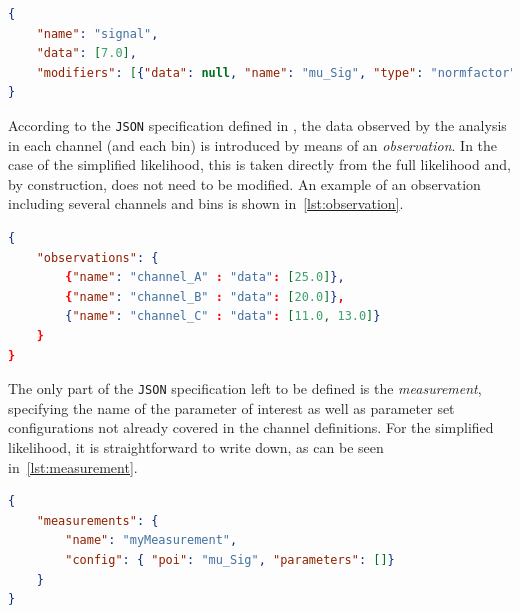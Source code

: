 \begin{minipage}{\linewidth}
\begin{lstlisting}[language=json,firstnumber=1,caption={Example of a signal sample with sample rate and unconstrained normalisation parameter.},captionpos=b, label=lst:sig_sample]
{
	"name": "signal",
	"data": [7.0],
	"modifiers": [{"data": null, "name": "mu_Sig", "type": "normfactor"}]
}
\end{lstlisting}
\end{minipage}

According to the \texttt{JSON} specification defined in \cite{ATL-PHYS-PUB-2019-029}, the data observed by the analysis in each channel (and each bin) is introduced by means of an \textit{observation}. In the case of the simplified likelihood, this is taken directly from the full likelihood and, by construction, does not need to be modified. An example of an observation including several channels and bins is shown in~\cref{lst:observation}.

\begin{minipage}{\linewidth}
\begin{lstlisting}[language=json,firstnumber=1,caption={Example of an observation in the simplified likelihood. It can be directly taken from the corresponding full likelihood. This example implements three channels, two with one bin, and one with three bins.},captionpos=b, label=lst:observation]
{
	"observations": {
		{"name": "channel_A" : "data": [25.0]},
		{"name": "channel_B" : "data": [20.0]},
		{"name": "channel_C" : "data": [11.0, 13.0]}
	}	
}
\end{lstlisting}
\end{minipage}

The only part of the \texttt{JSON} specification left to be defined is the \textit{measurement}, specifying the name of the parameter of interest as well as parameter set configurations not already covered in the channel definitions. For the simplified likelihood, it is straightforward to write down, as can be seen in~\cref{lst:measurement}.

\begin{minipage}{\linewidth}
\begin{lstlisting}[language=json,firstnumber=1,caption={Example of a measurement in the simplified likelihood. The signal strength is the parameter of interest, no additional parameters need further configuration.},captionpos=b, label=lst:measurement]
{
	"measurements": {
		"name": "myMeasurement",
		"config": { "poi": "mu_Sig", "parameters": []}
	}	
}
\end{lstlisting}
\end{minipage}

